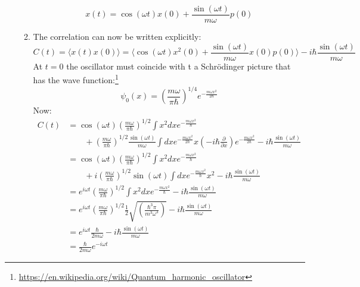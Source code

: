 \documentclass[12pt,a4]{article}
\begin{document}
\begin{enumerate}
\begin{enumerate}
        \begin{equation*}
          x(t) =  \cos (\omega t) x(0) + \frac{\sin(\omega t)}{m \omega} p(0)
        \end{equation*}
      \item
        The correlation can now be written explicitly:
        \begin{equation*}
          C(t) = \langle x(t) x(0) \rangle = \langle \cos (\omega t) x^2(0) + \frac{\sin(\omega t)}{m \omega} x(0) p(0)\rangle - i \hbar \frac{\sin(\omega t)}{m \omega}
        \end{equation*}
        At $t = 0$ the oscillator must coincide with t a Schr\"odinger picture that has the wave function:\footnote{\url{https://en.wikipedia.org/wiki/Quantum_harmonic_oscillator}}
        \begin{equation*}
          \psi_0(x) = \left(\frac{m \omega}{\pi \hbar}\right) ^{1/4} e^{ - \frac{m \omega x^2}{2 \hbar}}
        \end{equation*}
        Now:
        \begin{align*}
          C(t) &= \cos (\omega t) \left(\frac{m \omega}{\pi \hbar}\right) ^{1/2} \int x^2 dx e^{ - \frac{m \omega x^2}{\hbar}}\\
               & \qquad + \left(\frac{m \omega}{\pi \hbar} \right)^{1/2}\frac{\sin(\omega t)}{m \omega} \int dx e^{ - \frac{m \omega x^2}{ 2 \hbar}} x \left(-i \hbar\frac{\partial}{\partial x}\right) e^{ - \frac{m \omega x^2}{ 2 \hbar}} - i \hbar \frac{\sin(\omega t)}{m \omega}\\
               &= \cos (\omega t) \left(\frac{m \omega}{\pi \hbar}\right) ^{1/2} \int x^2 dx e^{ - \frac{m \omega x^2}{\hbar}}\\
               &\qquad + i \left(\frac{m \omega}{\pi \hbar} \right)^{1/2} \sin(\omega t) \int dx e^{ - \frac{m \omega x^2}{ \hbar}} x^2    - i \hbar \frac{\sin(\omega t)}{m \omega}\\
               &= e^{i \omega t} \left(\frac{m \omega}{\pi \hbar}\right) ^{1/2} \int x^2 dx e^{ - \frac{m \omega x^2}{\hbar}} - i \hbar \frac{\sin(\omega t)}{m \omega}\\
               &= e^{i \omega t} \left(\frac{m \omega}{\pi \hbar}\right) ^{1/2}\frac{1}{2}\sqrt{\left(\frac{\hbar ^3\pi}{m^3 \omega^3}\right)}  - i \hbar \frac{\sin(\omega t)}{m \omega}\\
               &= e^{i \omega t} \frac{\hbar}{ 2 m \omega}  - i \hbar \frac{\sin(\omega t)}{m \omega}\\
               &=  \frac{\hbar}{ 2 m \omega}e^{-i \omega t} 

\end{align*}
\end{enumerate}
\end{enumerate}
\end{document}
